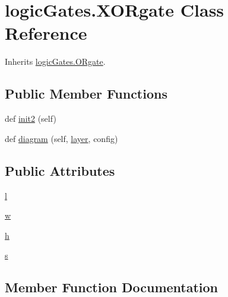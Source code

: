 \hypertarget{classlogic_gates_1_1_x_o_rgate}{}\section{logic\+Gates.\+X\+O\+Rgate Class Reference}
\label{classlogic_gates_1_1_x_o_rgate}


Inherits \hyperlink{classlogic_gates_1_1_o_rgate}{logic\+Gates.\+O\+Rgate}.

\subsection*{Public Member Functions}
\begin{DoxyCompactItemize}
\item 
def \hyperlink{classlogic_gates_1_1_x_o_rgate_a25eca7404e631052516890824ab8a345}{init2} (self)
\item 
def \hyperlink{classlogic_gates_1_1_x_o_rgate_ae58f69e5703e6e61307fc2d20cf9de42}{diagram} (self, \hyperlink{classpath_1_1_part_aa1d9912dfa1d7e3222df898d2a18786f}{layer}, config)
\end{DoxyCompactItemize}
\subsection*{Public Attributes}
\begin{DoxyCompactItemize}
\item 
\hyperlink{classlogic_gates_1_1_x_o_rgate_a181237b730e8172c62a1789b5e6a418d}{l}
\item 
\hyperlink{classlogic_gates_1_1_x_o_rgate_a7ac5f8b1e7b12b1f99256f1def471f7d}{w}
\item 
\hyperlink{classlogic_gates_1_1_x_o_rgate_a482818a967d7153279806f576e1239f6}{h}
\item 
\hyperlink{classlogic_gates_1_1_x_o_rgate_ad91478c42fd771f96c756c5b054f2d95}{s}
\end{DoxyCompactItemize}


\subsection{Member Function Documentation}
\hypertarget{classlogic_gates_1_1_x_o_rgate_ae58f69e5703e6e61307fc2d20cf9de42}{}
